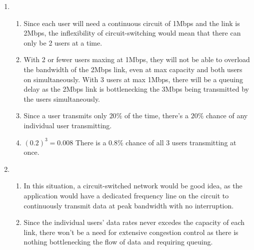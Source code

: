 \documentclass[12pt]{article}
\begin{document}
\begin{enumerate}
	\item \begin{enumerate}
			\item Since each user will need a continuous circuit of 1Mbps and the link is 2Mbps, the inflexibility of circuit-switching would mean that there can only be 2 users at a time.
			\item With 2 or fewer users maxing at 1Mbps, they will not be able to overload the bandwidth of the 2Mbps link, even at max capacity and both users on simultaneously. With 3 users at max 1Mbps, there will be a queuing delay as the 2Mbps link is bottlenecking the 3Mbps being transmitted by the users simultaneously.
			\item Since a user transmits only $20\%$ of the time, there's a $20\%$ chance of any individual user transmitting.
			\item $(0.2)^{3} = 0.008$ There is a 0.8\% chance of all 3 users transmitting at once.
		\end{enumerate}

	\item \begin{enumerate}
			\item In this situation, a circuit-switched network would be good idea, as the application would have a dedicated frequency line on the circuit to continuously transmit data at peak bandwidth with no interruption.
			\item Since the individual users' data rates never excedes the capacity of each link, there won't be a need for extensive congestion control as there is nothing bottlenecking the flow of data and requiring queuing.
		\end{enumerate}


\end{enumerate}
\end{document}
